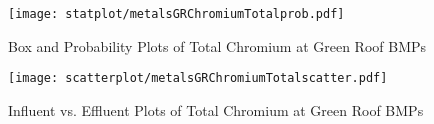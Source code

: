         \begin{figure}[hb]   %
            \centering
            \texttt{[image: statplot/metalsGRChromiumTotalprob.pdf]}
            \caption{Box and Probability Plots of Total Chromium at Green Roof BMPs}
        \end{figure}         %
        
        
        \begin{figure}[hb]   %
            \centering
            \texttt{[image: scatterplot/metalsGRChromiumTotalscatter.pdf]}
            \caption{Influent vs. Effluent Plots of Total Chromium at Green Roof BMPs}
        \end{figure}         %
        \clearpage
        